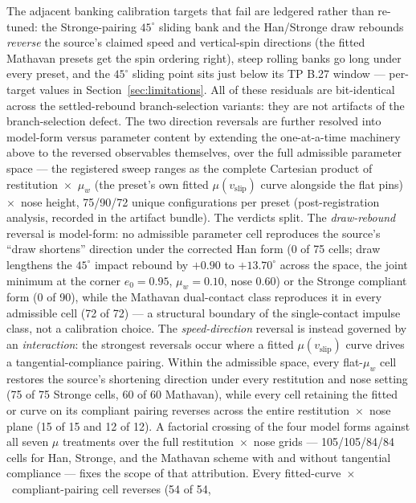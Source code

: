 The adjacent banking calibration targets that fail are ledgered rather
than re-tuned: the Stronge-pairing $45^\circ$ sliding bank and the
Han/Stronge draw rebounds \emph{reverse} the source's claimed speed and
vertical-spin directions (the fitted Mathavan presets get the spin
ordering right), steep rolling banks go long under every preset, and the
 $45^\circ$ sliding point sits just below its TP
B.27 window --- per-target values in Section~\ref{sec:limitations}. All of these residuals
are bit-identical across the settled-rebound branch-selection variants:
they are not artifacts of the branch-selection defect. The two
direction reversals are further resolved into model-form versus
parameter content by extending the one-at-a-time machinery above to the
reversed observables themselves, over the full admissible parameter
space --- the registered sweep ranges as the complete Cartesian product
of restitution~$\times$~$\mu_w$ (the preset's own fitted
$\mu(v_{\mathrm{slip}})$ curve alongside the flat pins)~$\times$~nose
height, 75/90/72 unique configurations per preset (post-registration
analysis, recorded in the artifact bundle). The verdicts
split. The \emph{draw-rebound} reversal is model-form: no admissible
parameter cell reproduces the source's ``draw shortens'' direction
under the corrected Han form (0 of 75 cells; draw lengthens the
$45^\circ$ impact rebound by $+0.90$ to $+13.70^\circ$ across the
space, the joint minimum at the corner $e_0 = 0.95$, $\mu_w = 0.10$,
nose $0.60$)
or the Stronge compliant form (0 of 90), while the Mathavan
dual-contact class reproduces it in every admissible cell (72 of 72)
--- a structural boundary of the single-contact impulse class, not a
calibration choice. The \emph{speed-direction} reversal is instead governed by an
\emph{interaction}: the strongest reversals occur where a fitted
$\mu(v_{\mathrm{slip}})$ curve drives a tangential-compliance pairing.
Within the admissible space,
every flat-$\mu_w$ cell restores the
source's shortening direction under every restitution and nose setting
(75 of 75 Stronge cells, 60 of 60 Mathavan), while every cell retaining
the fitted  or  curve on its
compliant pairing reverses across the entire
restitution~$\times$~nose plane (15 of 15 and 12 of 12). A factorial
crossing of the four model forms against all seven $\mu$ treatments
over the full restitution~$\times$~nose grids --- 105/105/84/84 cells
for Han, Stronge, and the Mathavan scheme with and without tangential
compliance --- fixes the scope of that attribution. Every
fitted-curve~$\times$~compliant-pairing cell reverses (54 of 54,
